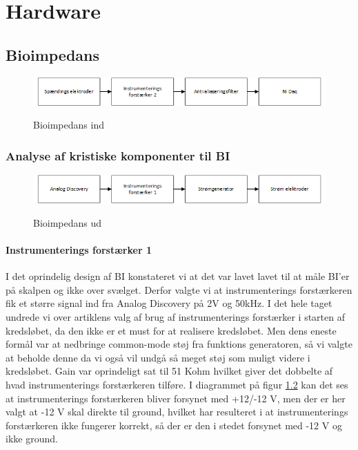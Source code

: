 \documentclass[main.tex]{subfiles}
\begin{document}
\chapter{Hardware}
\section{Bioimpedans}



\begin{figure}[H]
\centering
{\includegraphics[width=\linewidth]
{Figure/analyse2}}
\caption{Bioimpedans ind}
\label{BIdiagram}
\end{figure}

\subsection{Analyse af kristiske komponenter til BI}

\begin{figure}[H]
\centering
{\includegraphics[width=\linewidth]
{Figure/analyse1}}
\caption{Bioimpedans ud}
\label{BIdiagram}
\end{figure}

\subsubsection{Instrumenterings forstærker 1}
I det oprindelig design af BI konstateret vi at det var lavet lavet til at måle BI'er på skalpen og ikke over svælget. Derfor valgte vi at instrumenterings forstærkeren fik et større signal ind fra Analog Discovery på 2V og 50kHz. I det hele taget undrede vi over artiklens valg af brug af instrumenterings forstærker i starten af kredsløbet, da den ikke er et must for at realisere kredsløbet. Men dens eneste formål var at nedbringe common-mode støj fra funktions generatoren, så vi valgte at beholde denne da vi også vil undgå så meget støj som muligt videre i kredsløbet. Gain var oprindeligt sat til 51 Kohm hvilket giver det dobbelte af hvad instrumenterings forstærkeren tilføre. I diagrammet på figur \ref{BIdiagram} kan det ses at instrumenterings forstærkeren bliver forsynet med +12/-12 V, men der er her valgt at -12 V skal direkte til ground, hvilket har resulteret i at instrumenterings forstærkeren ikke fungerer korrekt, så der er den i stedet forsynet med -12 V og ikke ground.  
\end{document}
